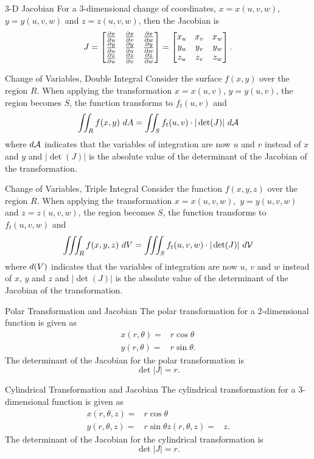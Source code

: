 \begin{definition}{3-D Jacobian}
For a $3$-dimensional change of coordinates, $x=x(u,v,w)$, $y=y(u,v,w)$ and $z=z(u,v,w)$, then the Jacobian is $$J=
\begin{bmatrix}
\frac{\partial x}{\partial u} & \frac{\partial x}{\partial v} & \frac{\partial x}{\partial w}\\
\frac{\partial y}{\partial u} & \frac{\partial y}{\partial u} & \frac{\partial y}{\partial w}\\
\frac{\partial z}{\partial u} & \frac{\partial z}{\partial v} & \frac{\partial z}{\partial w}
\end{bmatrix}=\begin{bmatrix}x_u & x_v & x_w \\ y_u & y_v & y_w \\ z_u & z_v & z_w\end{bmatrix}.$$
\end{definition}

\begin{claim}{Change of Variables, Double Integral}
Consider the surface $f(x,y)$ over the region $R$. When applying the transformation $x=x(u,v)$, $y=y(u,v)$, the region becomes $S$, the function transforms to $f_t(u,v)$ and $$\iint_R f(x,y)\ dA=\iint_S f_t(u,v)\cdot |\det(J)|\ d\mathcal{A} $$ where $d\mathcal{A}$ indicates that the variables of integration are now $u$ and $v$ instead of $x$ and $y$ and $|\det(J)|$ is the absolute value of the determinant of the Jacobian of the transformation.
\end{claim}

\begin{claim}{Change of Variables, Triple Integral}
Consider the function $f(x,y,z)$ over the region $R$. When applying the transformation $x=x(u,v,w),$ $y=y(u,v,w)$ and $z=z(u,v,w)$, the region becomes $S$, the function transforms to $f_t(u,v,w)$ and $$\iiint_R f(x,y,z)\ dV=\iiint_S f_t(u,v,w)\cdot |\det(J)| \ d\mathcal{V} $$ where $d\mathcal(V)$ indicates that the variables of integration are now $u$, $v$ and $w$ instead of $x$, $y$ and $z$ and $|\det(J)|$ is the absolute value of the determinant of the Jacobian of the transformation.
\end{claim}

\begin{definition}{Polar Transformation and Jacobian}
The polar transformation for a 2-dimensional function is given as 
\begin{align*}
x(r,\theta)=&r\cos\theta\\
y(r,\theta)=&r\sin\theta.
\end{align*}
The determinant of the Jacobian for the polar transformation is $$\det|J|=r. $$
\end{definition}

\begin{definition}{Cylindrical Transformation and Jacobian}
The cylindrical transformation for a 3-dimensional function is given as
\begin{align*}
x(r,\theta,z)=&r\cos\theta\\
y(r,\theta,z)=&r\sin\theta
z(r,\theta,z)=&z.
\end{align*}
The determinant of the Jacobian for the cylindrical transformation is $$\det|J|=r. $$
\end{definition}

